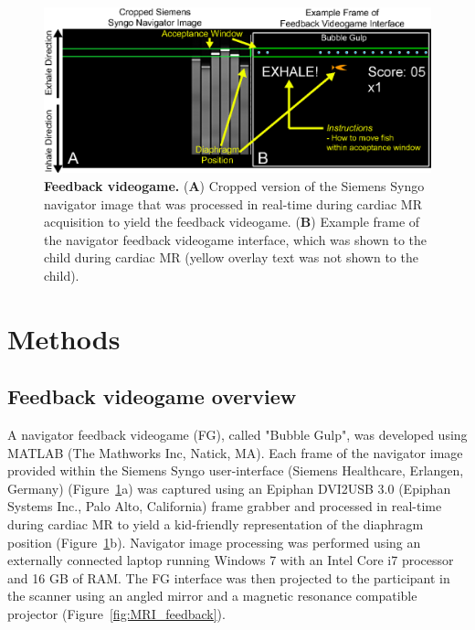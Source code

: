 \begin{figure} 
	\includegraphics{figures/gamepaper/01-FeedbackGame}
	\caption[Feedback videogame]{\textbf{Feedback videogame.} (\textbf{A}) Cropped version of the Siemens Syngo navigator image that was processed in real-time during cardiac MR acquisition to yield the feedback videogame. (\textbf{B}) Example frame of the navigator feedback videogame interface, which was shown to the child during cardiac MR (yellow overlay text was not shown to the child).}
	\label{fig:feedbackgame}
\end{figure}

\section{Methods}
\subsection{Feedback videogame overview}
	A navigator feedback videogame (FG), called "Bubble Gulp", was developed using MATLAB (The Mathworks Inc, Natick, MA). Each frame of the navigator image provided within the Siemens Syngo user-interface (Siemens Healthcare, Erlangen, Germany) (Figure~\ref{fig:feedbackgame}a) was captured using an Epiphan DVI2USB 3.0 (Epiphan Systems Inc., Palo Alto, California) frame grabber and processed in real-time during cardiac MR to yield a kid-friendly representation of the diaphragm position (Figure~\ref{fig:feedbackgame}b). Navigator image processing was performed using an externally connected laptop running Windows 7 with an Intel Core i7 processor and 16 GB of RAM. The FG interface was then projected to the participant in the scanner using an angled mirror and a magnetic resonance compatible projector (Figure~\ref{fig:MRI_feedback}).
	

